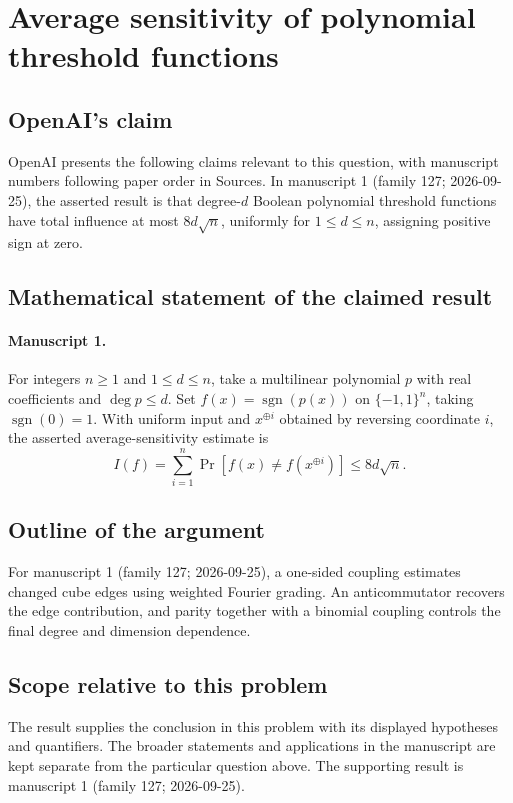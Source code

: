 \documentclass[11pt]{article}
\begin{document}
\section*{Average sensitivity of polynomial threshold functions}

\subsection{OpenAI's claim}
OpenAI presents the following claims relevant to this question, with manuscript numbers following paper order in Sources. In manuscript 1 (family 127; 2026-09-25), the asserted result is that degree-$d$ Boolean polynomial threshold functions have total influence at most $8d\sqrt n$, uniformly for $1\le d\le n$, assigning positive sign at zero.

\subsection{Mathematical statement of the claimed result}
\paragraph{Manuscript 1.}
For integers $n\ge1$ and $1\le d\le n$, take a multilinear polynomial $p$ with real coefficients and $\deg p\le d$. Set $f(x)=\operatorname{sgn}(p(x))$ on $\{-1,1\}^n$, taking $\operatorname{sgn}(0)=1$. With uniform input and $x^{\oplus i}$ obtained by reversing coordinate $i$, the asserted average-sensitivity estimate is
\[
 I(f)=\sum_{i=1}^n\Pr[f(x)\ne f(x^{\oplus i})]\le8d\sqrt n.
\]

\subsection{Outline of the argument}
For manuscript 1 (family 127; 2026-09-25), a one-sided coupling estimates changed cube edges using weighted Fourier grading. An anticommutator recovers the edge contribution, and parity together with a binomial coupling controls the final degree and dimension dependence.

\subsection{Scope relative to this problem}
The result supplies the conclusion in this problem with its displayed hypotheses and quantifiers. The broader statements and applications in the manuscript are kept separate from the particular question above. The supporting result is manuscript 1 (family 127; 2026-09-25).
\end{document}
